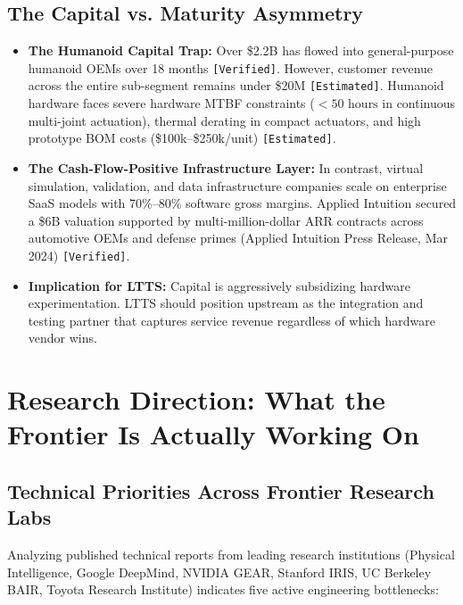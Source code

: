\documentclass[11pt,a4paper]{article}
\begin{document}
\subsection{The Capital vs. Maturity Asymmetry}
\begin{itemize}
    \item \textbf{The Humanoid Capital Trap:} Over \$2.2B has flowed into general-purpose humanoid OEMs over 18 months \texttt{[Verified]}. However, customer revenue across the entire sub-segment remains under \$20M \texttt{[Estimated]}. Humanoid hardware faces severe hardware MTBF constraints ($<50\text{ hours}$ in continuous multi-joint actuation), thermal derating in compact actuators, and high prototype BOM costs (\$100k--\$250k/unit) \texttt{[Estimated]}.
    \item \textbf{The Cash-Flow-Positive Infrastructure Layer:} In contrast, virtual simulation, validation, and data infrastructure companies scale on enterprise SaaS models with 70\%--80\% software gross margins. Applied Intuition secured a \$6B valuation supported by multi-million-dollar ARR contracts across automotive OEMs and defense primes (Applied Intuition Press Release, Mar 2024) \texttt{[Verified]}.
    \item \textbf{Implication for LTTS:} Capital is aggressively subsidizing hardware experimentation. LTTS should position upstream as the integration and testing partner that captures service revenue regardless of which hardware vendor wins.
\end{itemize}

\section{Research Direction: What the Frontier Is Actually Working On}

\subsection{Technical Priorities Across Frontier Research Labs}
Analyzing published technical reports from leading research institutions (Physical Intelligence, Google DeepMind, NVIDIA GEAR, Stanford IRIS, UC Berkeley BAIR, Toyota Research Institute) indicates five active engineering bottlenecks:
\end{document}
